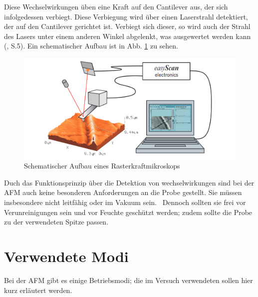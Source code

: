 Diese Wechselwirkungen üben eine Kraft auf den Cantilever aus, der sich infolgedessen verbiegt. Diese Verbiegung wird über einen 
Laserstrahl detektiert, der auf den Cantilever gerichtet ist. Verbiegt sich dieser, so wird auch der Strahl des Lasers unter einem anderen 
Winkel abgelenkt, was ausgewertet werden kann (\cite{Haugstad2012}, S.5). Ein schematischer Aufbau ist in Abb. \ref{bild:Aufbau} zu sehen.

\begin{figure}[h]
    \centering
    \includegraphics[scale = 0.45]{Bilder/AufbauAFM.png}
    \caption{Schematischer Aufbau eines Rasterkraftmikroskops \protect \footnotemark}
    \label{bild:Aufbau}
\end{figure}

Duch das Funktionsprinzip über die Detektion von wechselwirkungen sind bei der AFM auch keine besonderen Anforderungen an die Probe 
gestellt. Sie müssen insbesondere nicht leitfähig oder im Vakuum sein. \footnotemark \, Dennoch sollten sie frei vor Verunreinigungen sein 
und vor Feuchte geschützt werden; zudem sollte die Probe zu der verwendeten Spitze passen. \\


\newpage


\section{Verwendete Modi}
\label{sec:Modi}
Bei der AFM gibt es einige Betriebsmodi; die im Versuch verwendeten sollen hier kurz erläutert werden.

